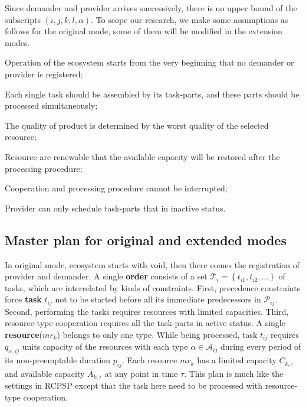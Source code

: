 Since demander and provider arrives successively, there is no upper bound of the subscripts
$(i,j,k,l,\alpha)$.
To scope our research, we make some assumptions as follows for the original mode, some of them will be modified in the extension modes.
\begin{compactitem}
\item Operation of the ecosystem starts from the very beginning that no demander or provider is registered;
\item Each single task should be assembled by its task-parts, and these parts should be processed simultaneously;
\item The quality of product is determined by the worst quality of the selected resource;
\item Resource are renewable that the available capacity will be restored after the processing procedure;
\item Cooperation and processing procedure cannot be interrupted;
\item Provider can only schedule task-parts that in inactive status.
\end{compactitem}

\subsection{Master plan for original and extended modes} %
\label{ssub:master_plam}

In original mode, ecosystem starts with void, then there comes the registration of provider and demander. A single \textbf{order} consists of a set $\mathcal{T}_i = \left\{ t_{i1},t_{i2},\dots\right\}$ of tasks, which are interrelated by kinds of constraints. First, precedence constraints force \textbf{task} $t_{ij}$ not to be started before all its immediate predecessors in $\mathcal{P}_{ij}$. Second, performing the tasks requires resources with limited capacities. Third, resource-type cooperation requires all the task-parts in active status.
A single \textbf{resource}($mr_k$) belongs to only one type. While being processed, task $t_{ij}$ requires $q_{\alpha,ij}$ units capacity of the resources with each type $\alpha\in\mathcal{A}_{ij}$ during every period of its non-preemptable duration $p_{ij}$. Each resource $mr_k$ has a limited capacity $C_{k,\tau}$ and available capacity $A_{k,\tau}$ at any point in time $\tau$. This plan is much like the settings in RCPSP\cite{Kolisch1999} except that the task here need to be processed with resource-type cooperation.

